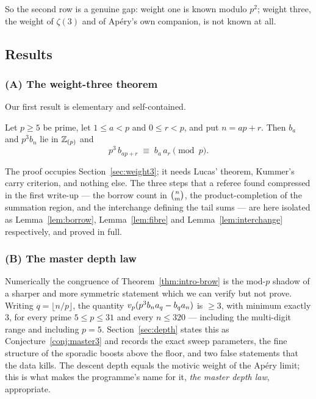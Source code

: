 So the second row is a genuine gap: weight one is known modulo $p^2$; weight three, the
weight of $\zeta(3)$ and of Ap\'ery's own companion, is not known at all.

\subsection{Results}
\label{ssec:results}

\subsubsection*{(A) The weight-three theorem}
Our first result is elementary and self-contained.

\begin{theorem}
\label{thm:intro-brow}
Let $p\ge 5$ be prime, let $1\le a<p$ and $0\le r<p$, and put $n=ap+r$. Then $b_a$ and
$p^3b_n$ lie in $\mathbb{Z}_{(p)}$ and
\[
   p^3\,b_{ap+r}\;\equiv\;b_a\,a_r \pmod p .
\]
\end{theorem}

The proof occupies Section~\ref{sec:weight3}; it needs Lucas' theorem, Kummer's carry
criterion, and nothing else. The three steps that a referee found compressed in the first
write-up --- the borrow count in $\binom{n}{m}$, the product-completion of the summation
region, and the interchange defining the tail sums --- are here isolated as
Lemma~\ref{lem:borrow}, Lemma~\ref{lem:fibre} and Lemma~\ref{lem:interchange}
respectively, and proved in full.

\subsubsection*{(B) The master depth law}
Numerically the congruence of Theorem~\ref{thm:intro-brow} is the mod-$p$ shadow of a
sharper and more symmetric statement which we can verify but not prove. Writing
$q=\lfloor n/p\rfloor$, the quantity $v_p(p^3b_na_q-b_qa_n)$ is $\ge 3$, with minimum
exactly $3$, for every prime $5\le p\le 31$ and every $n\le 320$ --- including the
multi-digit range and including $p=5$. Section~\ref{sec:depth} states this as
Conjecture~\ref{conj:master3} and records the exact sweep parameters, the fine structure
of the sporadic boosts above the floor, and two false statements that the data kills. The
descent depth equals the motivic weight of the Ap\'ery limit; this is what makes the
programme's name for it, \emph{the master depth law}, appropriate.

